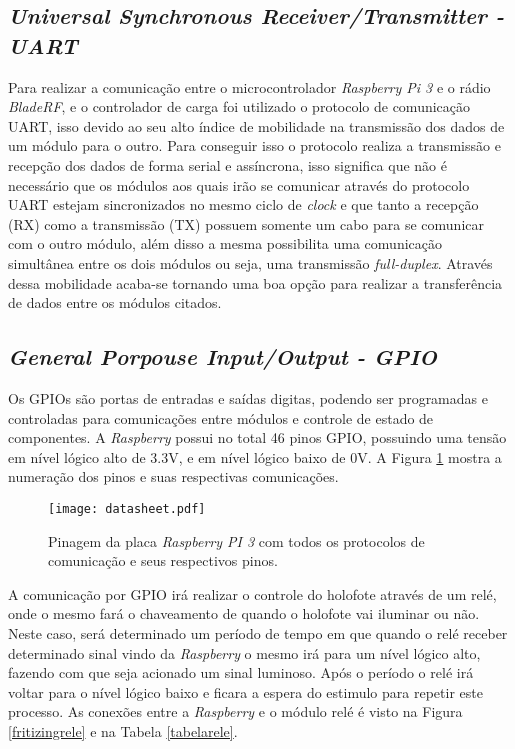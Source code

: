 \subsection{\emph{Universal Synchronous Receiver/Transmitter - UART}}
    Para realizar a comunicação entre o microcontrolador \emph{Raspberry Pi 3} e o rádio \emph{BladeRF}, e o controlador de carga foi utilizado o protocolo de comunicação UART, isso devido ao seu alto índice de mobilidade na transmissão dos dados de um módulo para o outro. Para conseguir isso o protocolo realiza a transmissão e recepção dos dados de forma serial e assíncrona, isso significa que não é necessário que os módulos aos quais irão se comunicar através do protocolo UART estejam sincronizados no mesmo ciclo de \emph{clock} e que tanto a recepção (RX) como a transmissão (TX) possuem somente um cabo para se comunicar com o outro módulo, além disso a mesma possibilita uma comunicação simultânea entre os dois módulos ou seja, uma transmissão \emph{full-duplex}. Através dessa mobilidade acaba-se tornando uma boa opção para realizar a transferência de dados entre os módulos citados.
    
    


\subsection{\emph{General Porpouse Input/Output - GPIO}}

Os GPIOs são portas de entradas e saídas digitas, podendo ser programadas e controladas para comunicações entre módulos e controle de estado de componentes. A \emph{Raspberry} possui no total 46 pinos GPIO, possuindo uma tensão em nível lógico alto de 3.3V, e em nível lógico baixo de 0V. A Figura \ref{datasheet} mostra a numeração dos pinos e suas respectivas comunicações.

\begin{figure}[H]
    \centering
    \texttt{[image: datasheet.pdf]}
    \caption {Pinagem da placa \emph{Raspberry PI 3} com todos os protocolos de comunicação e seus respectivos pinos.}
    \label{datasheet}
\end{figure}


A comunicação por GPIO irá realizar o controle do holofote através de um relé, onde o mesmo fará o chaveamento de quando o holofote vai iluminar ou não. Neste caso, será determinado um período de tempo em que quando o relé receber determinado sinal vindo da \emph{Raspberry} o mesmo irá para um nível lógico alto, fazendo com que seja acionado um sinal luminoso. Após o período o relé irá voltar para o nível lógico baixo e ficara a espera do estimulo para repetir este processo.  As conexões entre a \emph{Raspberry} e o módulo relé é visto na Figura \ref{fritizingrele} e na Tabela \ref{tabelarele}.

